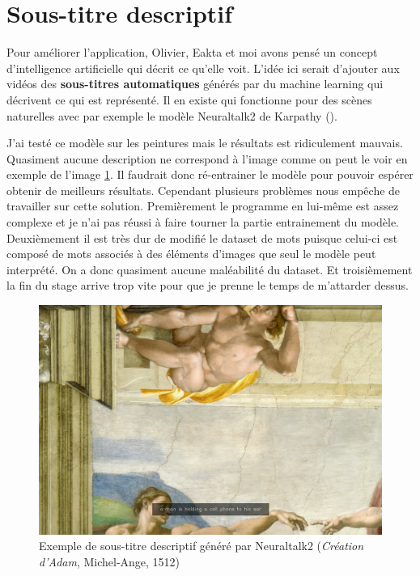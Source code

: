 \section{Sous-titre descriptif}

\par
Pour améliorer l'application, Olivier, Eakta et moi avons pensé un concept d'intelligence artificielle qui décrit ce qu'elle voit. L'idée ici serait d'ajouter aux vidéos des \textbf{sous-titres automatiques} générés par du machine learning qui décrivent ce qui est représenté. Il en existe qui fonctionne pour des scènes naturelles avec par exemple le modèle Neuraltalk2 de Karpathy ().

\par
J'ai testé ce modèle sur les peintures mais le résultats est ridiculement mauvais. Quasiment aucune description ne correspond à l'image comme on peut le voir en exemple de l'image \ref{fig:ex_neuraltalk}. Il faudrait donc ré-entrainer le modèle pour pouvoir espérer obtenir de meilleurs résultats. Cependant plusieurs problèmes nous empêche de travailler sur cette solution. Premièrement le programme en lui-même est assez complexe et je n'ai pas réussi à faire tourner la partie entrainement du modèle. Deuxièmement il est très dur de modifié le dataset de mots puisque celui-ci est composé de mots associés à des éléments d'images que seul le modèle peut interprété. On a donc quasiment aucune maléabilité du dataset. Et troisièmement la fin du stage arrive trop vite pour que je prenne le temps de m'attarder dessus.

\begin{figure}[ht]
  \centering
  \includegraphics[width=0.7\linewidth]{datas/exemple_sous_titre.png}
  \caption{Exemple de sous-titre descriptif généré par Neuraltalk2 (\emph{Création d'Adam}, Michel-Ange, 1512)}
  \label{fig:ex_neuraltalk}
\end{figure}

